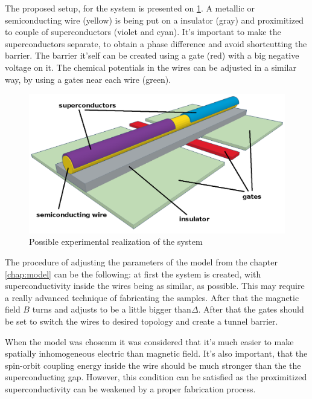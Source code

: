The proposed  setup, for the system is presented on \ref{fig:realmodel3}.  A metallic or semiconducting wire (yellow) is being put on a insulator (gray) and proximitized to couple of superconductors (violet and cyan). It's important to make the superconductors separate, to obtain a phase difference and avoid shortcutting the barrier. The barrier it'self can be created using a gate (red) with a big negative voltage on it.
The chemical potentials in the wires can be adjusted in a similar way, by using a gates near each wire (green).
\begin{figure}[H]
	\centering
	\includegraphics[width=0.7\linewidth]{images/real_model_3}
	\caption{Possible experimental realization of the system}
	\label{fig:realmodel3}
\end{figure}
The procedure of adjusting the parameters of the model from the chapter \ref{chap:model} can be the following: at first the system is created, with superconductivity inside the wires being as similar, as possible. This may require a really advanced technique of fabricating the samples. After that the magnetic field $ B $ turns and adjusts to be a little bigger than$ \Delta $. After that the gates should be set to switch the wires to desired topology and create a tunnel barrier.

When the model was chosenm it was considered that it's much easier to make spatially inhomogeneous electric than magnetic field. It's also important, that the spin-orbit coupling energy inside the wire should be much stronger than the the superconducting gap. However, this condition can be satisfied as the proximitized superconductivity can be weakened	 by a proper fabrication process.